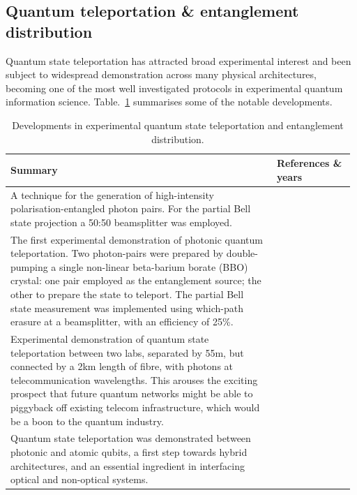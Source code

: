 \documentclass[aps, rmp, twocolumn, amsmath, amssymb, nofootinbib, superscriptaddress, longbibliography, floatfix, table-of-contents, eqsecnum]{revtex4-1}
\begin{document}
%
%

\subsection{Quantum teleportation \& entanglement distribution}   

Quantum state teleportation has attracted broad experimental interest and been subject to widespread demonstration across many physical architectures, becoming one of the most well investigated protocols in experimental quantum information science. Table.~\ref{tab:state_tomo} summarises some of the notable developments.

\begin{table}[!htb]
\caption{Developments in experimental quantum state teleportation and entanglement distribution.} \label{tab:state_tomo}
\begin{tabular}{|p{0.755\linewidth}|p{0.22\linewidth}|}
	\hline
	Summary & References \& years \\
	\hline \hline
	A technique for the generation of high-intensity polarisation-entangled photon pairs. For the partial Bell state projection a 50:50 beamsplitter was employed. & \cite{kwiat1995new, bib:Euro_25_559} \\
	\hline
	The first experimental demonstration of photonic quantum teleportation. Two photon-pairs were prepared by double-pumping a single non-linear beta-barium borate (BBO) crystal: one pair employed as the entanglement source; the other to prepare the state to teleport. The partial Bell state measurement was implemented using which-path erasure at a beamsplitter, with an efficiency of 25\%. & \cite{bib:Boumeester97} \\
	\hline
	Experimental demonstration of quantum state teleportation between two labs, separated by 55m, but connected by a 2km length of fibre, with photons at telecommunication wavelengths. This arouses the exciting prospect that future quantum networks might be able to piggyback off existing telecom infrastructure, which would be a boon to the quantum industry. & \cite{bib:Nat_421_509} \\
	\hline
	Quantum state teleportation was demonstrated between photonic and atomic qubits, a first step towards hybrid architectures, and an essential ingredient in interfacing optical and non-optical systems. & \cite{bib:Chen08} \\

\end{tabular}
\end{table}
\end{document}
